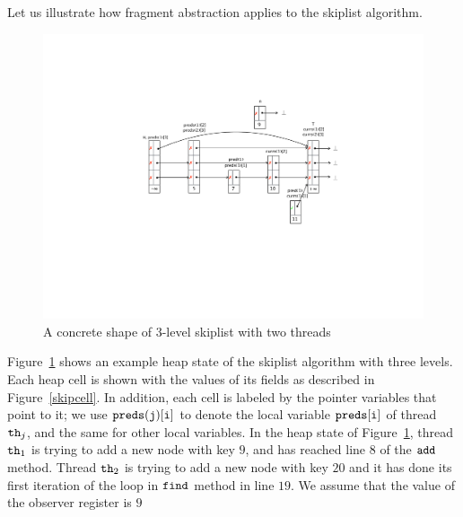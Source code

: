 Let us illustrate how fragment abstraction applies to the skiplist
algorithm.
\begin{figure}
\center  
 \includegraphics[width=1.2\textwidth, trim={7cm 8cm 0.5cm 6cm}, clip]{skipshape.pdf}  
 \caption{A concrete shape of 3-level skiplist with two threads}
\label{sl-shape}
\end{figure}
Figure~\ref{sl-shape} shows an example heap state of the
skiplist algorithm with three levels. Each heap cell is shown with the values of its fields as described in Figure~\ref{skipcell}. %
In addition, each cell is labeled by the
pointer variables that point to it; we use ${\tt preds(j)[i]}$ to denote the local
variable ${\tt preds[i]}$ of thread ${\tt th}_j$, and the same for other local variables.
In the heap state of Figure~\ref{sl-shape}, thread ${\tt th}_1$ is trying to add a new node with key $9$, and has reached line $8$ of the $\tt add$ method. Thread ${\tt th}_2$ is trying to add a new node with key $20$ and it has done its first iteration of the loop in $\tt find$ method in line $19$. We assume that the value of the observer register is $9$





